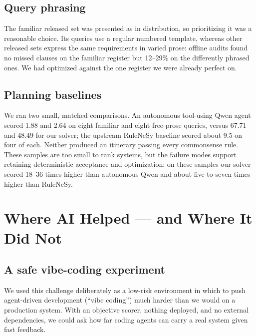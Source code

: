 \documentclass{article}
\begin{document}

\subsection{Query phrasing}
The familiar released set was presented as in distribution, so prioritizing it was
a reasonable choice. Its queries use a regular numbered template, whereas other
released sets express the same requirements in varied prose: offline audits found
no missed clauses on the familiar register but 12--29\% on the differently phrased
ones. We had optimized against the one register we were already perfect on.

\subsection{Planning baselines}

We ran two small, matched comparisons. An autonomous tool-using Qwen agent scored
1.88 and 2.64 on eight familiar and eight free-prose queries, versus 67.71 and
48.49 for our solver; the upstream RuleNeSy baseline \cite{shao2024chinatravel}
scored about 9.5 on four of each. Neither produced an itinerary passing every
commonsense rule.
These samples are too small to rank systems, but the failure modes support
retaining deterministic acceptance and optimization: on these samples our
solver scored 18--36 times higher than autonomous Qwen and about five to seven
times higher than RuleNeSy.

\section{Where AI Helped --- and Where It Did Not}
\label{sec:ai}

\subsection{A safe vibe-coding experiment}

We used this challenge deliberately as a low-risk environment in which to push
agent-driven development (``vibe coding'') much harder than we would on a production system.
With an objective scorer, nothing deployed, and no external dependencies, we
could ask how far coding agents can carry a real system given fast feedback.
\end{document}
